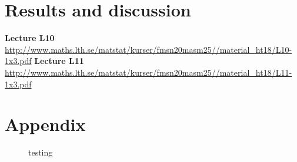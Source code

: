 \documentclass[a4paper,english]{article}
\newcommand{\sexion}[1]{\section{#1}}
\begin{document}
\section{Results and discussion}


\newpage

\begin{thebibliography}{37}
  \textbf{Lecture L10} \\
\url{http://www.maths.lth.se/matstat/kurser/fmsn20masm25//material_ht18/L10-1x3.pdf}
  \textbf{Lecture L11} \\
\url{http://www.maths.lth.se/matstat/kurser/fmsn20masm25//material_ht18/L11-1x3.pdf}
\end{thebibliography}
\pagebreak{}

\sexion{Appendix}
\begin{figure}[H]
  \centering
  \caption{testing}
  \label{fig:kmeans:1:2:1}
\end{figure}


% 


\pagebreak{}
\thispagestyle{empty}
\end{document}
